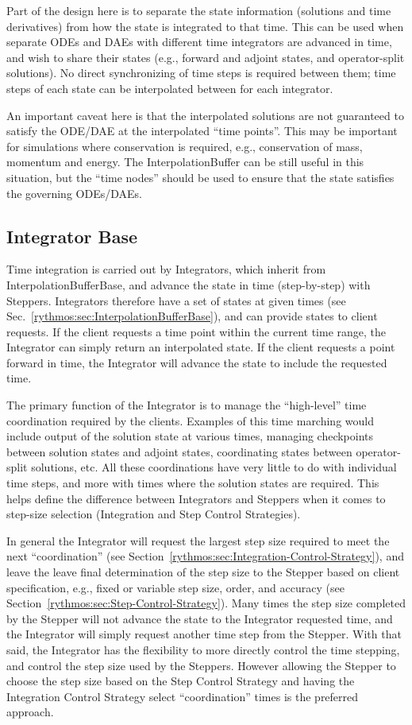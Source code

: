 Part of the design here is to separate the state information (solutions
and time derivatives) from how the state is integrated to that time.
This can be used when separate ODEs and DAEs with different time integrators
are advanced in time, and wish to share their states (e.g., forward
and adjoint states, and operator-split solutions). No direct synchronizing
of time steps is required between them; time steps of each state can
be interpolated between for each integrator. 

An important caveat here is that the interpolated solutions are not
guaranteed to satisfy the ODE/DAE at the interpolated ``time points''.
This may be important for simulations where conservation is required,
e.g., conservation of mass, momentum and energy. The InterpolationBuffer
can be still useful in this situation, but the ``time nodes'' should
be used to ensure that the state satisfies the governing ODEs/DAEs.

\subsection{Integrator Base}

Time integration is carried out by Integrators, which inherit from
InterpolationBufferBase, and advance the state in time (step-by-step)
with Steppers. Integrators therefore have a set of states at given
times (see Sec.~\ref{rythmos:sec:InterpolationBufferBase}), and
can provide states to client requests. If the client requests a time
point within the current time range, the Integrator can simply return
an interpolated state. If the client requests a point forward in time,
the Integrator will advance the state to include the requested time.

The primary function of the Integrator is to manage the ``high-level''
time coordination required by the clients. Examples of this time marching
would include output of the solution state at various times, managing
checkpoints between solution states and adjoint states, coordinating
states between operator-split solutions, etc. All these coordinations
have very little to do with individual time steps, and more with times
where the solution states are required. This helps define the difference
between Integrators and Steppers when it comes to step-size selection
(Integration and Step Control Strategies).

In general the Integrator will request the largest step size required
to meet the next ``coordination'' (see Section~\ref{rythmos:sec:Integration-Control-Strategy}),
and leave the leave final determination of the step size to the Stepper
based on client specification, e.g., fixed or variable step size,
order, and accuracy (see Section~\ref{rythmos:sec:Step-Control-Strategy}).
Many times the step size completed by the Stepper will not advance
the state to the Integrator requested time, and the Integrator will
simply request another time step from the Stepper. With that said,
the Integrator has the flexibility to more directly control the time
stepping, and control the step size used by the Steppers. However
allowing the Stepper to choose the step size based on the Step Control
Strategy and having the Integration Control Strategy select ``coordination''
times is the preferred approach.

